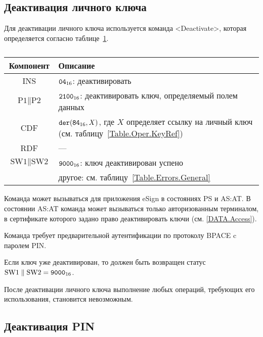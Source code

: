 \subsection{Деактивация личного ключа}
\label{Oper.Descr.DeactivateKey} 

Для деактивации личного ключа 
используется команда <Deactivate>,
которая определяется согласно 
таблице~\ref{Table.Oper.DeactivateKeyCmd}.

\begin{table}[hbt]
\caption{}\label{Table.Oper.DeactivateKeyCmd}
\begin{tabular}{|c|p{14cm}|}
\hline
Компонент & Описание\\
\hline
\hline
INS & $\texttt{04}_{16}$: деактивировать\\
\hline
$\text{P1} \parallel \text{P2}$ & $\texttt{2100}_{16}$: 
деактивировать ключ, определяемый полем данных\\
\hline
CDF &  $\texttt{der}(\texttt{84}_{16}, X)$,   
где $X$ определяет ссылку на личный ключ 
(см. таблицу~\ref{Table.Oper.KeyRef})\\
\hline 
RDF & --- \\
\hline
$\text{SW1} \parallel \text{SW2}$ & 
$\texttt{9000}_{16}$: ключ деактивирован успено \\
  & другое: см. таблицу~\ref{Table.Errors.General} \\
\hline
\end{tabular}
\end{table}

Команда может вызываться для приложения eSign в состояниях 
PS и AS:AT. В состоянии AS:AT команда может вызываться 
только авторизованным терминалом, в сертификате которого задано право
деактивировать ключи (см. \ref{DATA.Access}).

Команда требует предварительной аутентификации по 
протоколу BPACE c паролем PIN. 

Если ключ уже деактивирован, то должен быть возвращен статус
$\text{SW1} \parallel \text{SW2} = \texttt{9000}_{16}$.

После деактивации личного ключа выполнение любых операций, 
требующих его использования, становится невозможным.

\subsection{Деактивация PIN}
\label{Oper.Descr.DeactivatePIN} 

